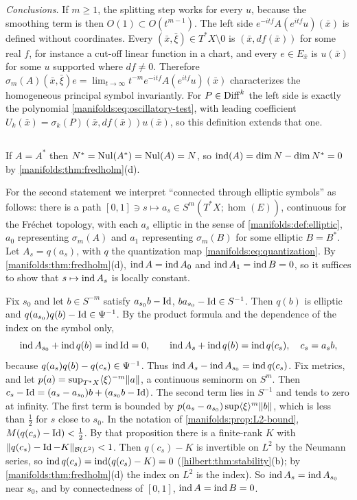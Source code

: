 \emph{Conclusions.} If $m\ge1$, the splitting step works for every $u$, because the smoothing
term is then $O(1)\subset O(t^{m-1})$. The left side
$e^{-itf}A(e^{itf}u)(\bar x)$ is defined without coordinates. Every
$(\bar x,\bar\xi)\in T^*X\setminus0$ is $(\bar x,df(\bar x))$ for some real $f$, for instance a cut-off linear
function in a chart, and every $e\in E_{\bar x}$ is $u(\bar x)$ for some $u$ supported where
$df\ne0$. Therefore
$\sigma_m(A)(\bar x,\bar\xi)e=\lim_{t\to\infty}t^{-m}e^{-itf}A(e^{itf}u)(\bar x)$ characterizes the
homogeneous principal symbol invariantly. For $P\in\operatorname{Diff}^{k}$ the left side is exactly the
polynomial \eqref{manifolds:eq:oscillatory-test}, with leading coefficient
$U_k(\bar x)=\sigma_k(P)(\bar x,df(\bar x))u(\bar x)$, so this definition extends that one.

\subsection*{}
If $A=A^*$ then $N^*=\operatorname{Nul}(A^*)=\operatorname{Nul}(A)=N$, so $\operatorname{ind}(A)=\dim N-\dim N^*=0$ by
\cref{manifolds:thm:fredholm}(d).

For the second statement we interpret ``connected through elliptic symbols'' as follows:
there is a path $[0,1]\ni s\mapsto a_s\in S^m(T^*X;\hom(E))$, continuous for the Fr\'echet
topology, with each $a_s$ elliptic in the sense of \cref{manifolds:def:elliptic},
$a_0$ representing $\sigma_m(A)$ and $a_1$ representing $\sigma_m(B)$ for some elliptic
$B=B^*$. Let $A_s=q(a_s)$, with $q$ the quantization map \eqref{manifolds:eq:quantization}.
By \cref{manifolds:thm:fredholm}(d), $\operatorname{ind} A=\operatorname{ind} A_0$ and $\operatorname{ind} A_1=\operatorname{ind} B=0$, so it
suffices to show that $s\mapsto\operatorname{ind} A_s$ is locally constant.

Fix $s_0$ and let $b\in S^{-m}$ satisfy $a_{s_0}b-\operatorname{Id}$, $ba_{s_0}-\operatorname{Id}\in S^{-1}$. Then $q(b)$ is
elliptic and $q(a_{s_0})q(b)-\operatorname{Id}\in\Psi^{-1}$. By the product formula and the dependence of
the index on the symbol only,
\begin{equation*}
\operatorname{ind} A_{s_0}+\operatorname{ind} q(b)=\operatorname{ind}\operatorname{Id}=0,\qquad
\operatorname{ind} A_s+\operatorname{ind} q(b)=\operatorname{ind} q(c_s),\quad c_s=a_sb,
\end{equation*}
because $q(a_s)q(b)-q(c_s)\in\Psi^{-1}$. Thus $\operatorname{ind} A_s-\operatorname{ind} A_{s_0}=\operatorname{ind} q(c_s)$. Fix
metrics, and let $p(a)=\sup_{T^*X}\langle \xi\rangle^{-m}\lVert a\rVert$, a continuous seminorm on $S^m$.
Then $c_s-\operatorname{Id}=(a_s-a_{s_0})b+(a_{s_0}b-\operatorname{Id})$. The second term lies in $S^{-1}$ and tends to
zero at infinity. The first term is bounded by $p(a_s-a_{s_0})\sup\langle \xi\rangle^m\lVert b\rVert$, which is
less than $\frac12$ for $s$ close to $s_0$. In the notation of
\cref{manifolds:prop:L2-bound}, $M(q(c_s)-\operatorname{Id})<\frac12$. By that proposition there is a
finite-rank $K$ with $\lVert q(c_s)-\operatorname{Id}-K\rVert_{\mathcal{B}(L^2)}<1$. Then $q(c_s)-K$ is invertible on
$L^2$ by the Neumann series, so $\operatorname{ind} q(c_s)=\operatorname{ind}(q(c_s)-K)=0$
(\cref{hilbert:thm:stability}(b); by \cref{manifolds:thm:fredholm}(d) the index on $L^2$
is the index). So $\operatorname{ind} A_s=\operatorname{ind} A_{s_0}$ near $s_0$, and by connectedness of $[0,1]$,
$\operatorname{ind} A=\operatorname{ind} B=0$.

